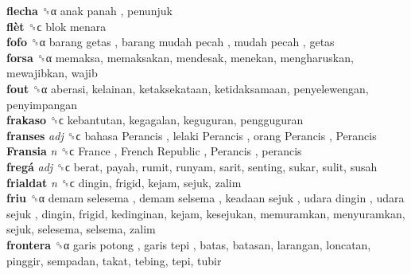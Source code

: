 \textbf{flecha} ␝α   anak panah , penunjuk  \\
\textbf{flèt} ␝ϲ   blok menara   \\
\textbf{fofo} ␝α   barang getas ,  barang mudah pecah ,  mudah pecah , getas  \\
\textbf{forsa} ␝α  memaksa, memaksakan, mendesak, menekan, mengharuskan, mewajibkan, wajib  \\
\textbf{fout} ␝α  aberasi, kelainan, ketaksekataan, ketidaksamaan, penyelewengan, penyimpangan  \\
\textbf{frakaso} ␝ϲ  kebantutan, kegagalan, keguguran, pengguguran  \\
\textbf{franses} \emph{adj}  ␝ϲ   bahasa Perancis ,  lelaki Perancis ,  orang Perancis ,  Perancis   \\
\textbf{Fransia} \emph{n}  ␝ϲ   France ,  French Republic ,  Perancis , perancis  \\
\textbf{fregá} \emph{adj}  ␝ϲ  berat, payah, rumit, runyam, sarit, senting, sukar, sulit, susah  \\
\textbf{frialdat} \emph{n}  ␝ϲ  dingin, frigid, kejam, sejuk, zalim  \\
\textbf{friu} ␝α   demam selesema ,  demam selsema ,  keadaan sejuk ,  udara dingin ,  udara sejuk , dingin, frigid, kedinginan, kejam, kesejukan, memuramkan, menyuramkan, sejuk, selesema, selsema, zalim  \\
\textbf{frontera} ␝α   garis potong ,  garis tepi , batas, batasan, larangan, loncatan, pinggir, sempadan, takat, tebing, tepi, tubir  \\
